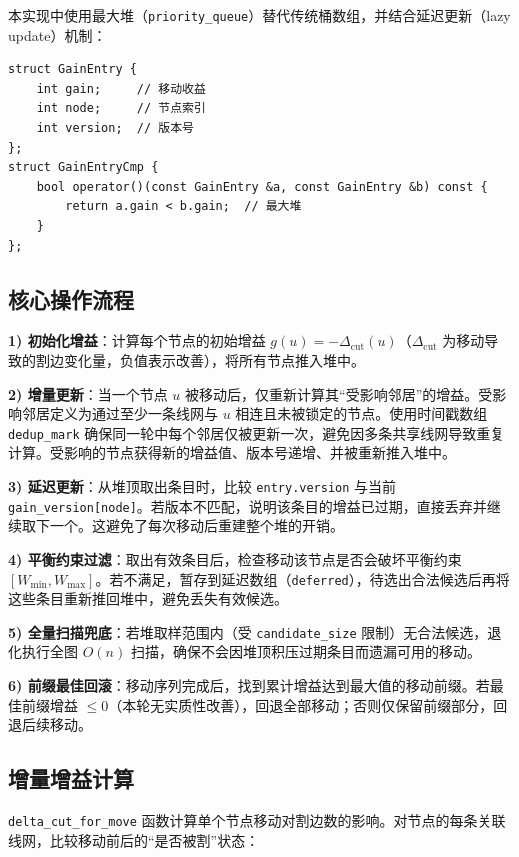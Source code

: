 \documentclass[journal, twocolumn]{IEEEtran}
\begin{document}
本实现中使用最大堆（\texttt{priority\_queue}）替代传统桶数组，并结合延迟更新（lazy update）机制：

\begin{lstlisting}
struct GainEntry {
    int gain;     // 移动收益
    int node;     // 节点索引
    int version;  // 版本号
};
struct GainEntryCmp {
    bool operator()(const GainEntry &a, const GainEntry &b) const {
        return a.gain < b.gain;  // 最大堆
    }
};
\end{lstlisting}

\subsection{核心操作流程}

\textbf{1) 初始化增益}：计算每个节点的初始增益 $g(u) = -\Delta_{\text{cut}}(u)$（$\Delta_{\text{cut}}$ 为移动导致的割边变化量，负值表示改善），将所有节点推入堆中。

\textbf{2) 增量更新}：当一个节点 $u$ 被移动后，仅重新计算其“受影响邻居”的增益。受影响邻居定义为通过至少一条线网与 $u$ 相连且未被锁定的节点。使用时间戳数组 \texttt{dedup\_mark} 确保同一轮中每个邻居仅被更新一次，避免因多条共享线网导致重复计算。受影响的节点获得新的增益值、版本号递增、并被重新推入堆中。

\textbf{3) 延迟更新}：从堆顶取出条目时，比较 \texttt{entry.version} 与当前 \texttt{gain\_version[node]}。若版本不匹配，说明该条目的增益已过期，直接丢弃并继续取下一个。这避免了每次移动后重建整个堆的开销。

\textbf{4) 平衡约束过滤}：取出有效条目后，检查移动该节点是否会破坏平衡约束 $[W_{\min}, W_{\max}]$。若不满足，暂存到延迟数组（\texttt{deferred}），待选出合法候选后再将这些条目重新推回堆中，避免丢失有效候选。

\textbf{5) 全量扫描兜底}：若堆取样范围内（受 \texttt{candidate\_size} 限制）无合法候选，退化执行全图 $O(n)$ 扫描，确保不会因堆顶积压过期条目而遗漏可用的移动。

\textbf{6) 前缀最佳回滚}：移动序列完成后，找到累计增益达到最大值的移动前缀。若最佳前缀增益 $\le 0$（本轮无实质性改善），回退全部移动；否则仅保留前缀部分，回退后续移动。

\subsection{增量增益计算}

\texttt{delta\_cut\_for\_move} 函数计算单个节点移动对割边数的影响。对节点的每条关联线网，比较移动前后的“是否被割”状态：
\end{document}
